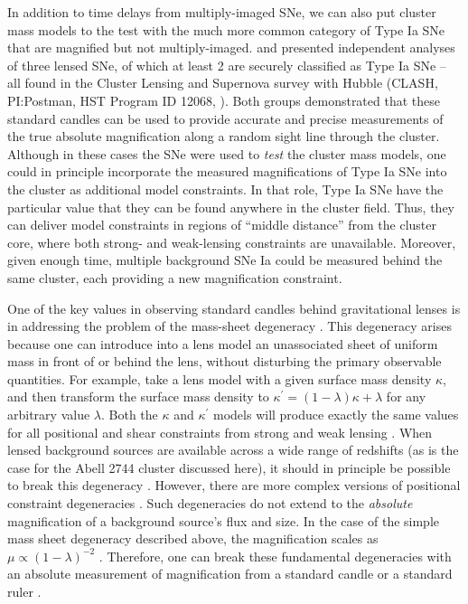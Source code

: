 In addition to time delays from multiply-imaged SNe, we can also
put cluster mass models to the test with the much more common category
of Type Ia SNe that are magnified but not multiply-imaged.  
\citet[][hereafter P14]{Patel:2014} and \citet{Nordin:2014} presented
independent analyses of three lensed SNe, of which at least 2 are
securely classified as Type Ia SNe -- all found in the Cluster Lensing
and Supernova survey with Hubble (CLASH, PI:Postman, HST Program ID
12068, \citealt{Postman:2012}).  Both groups demonstrated that these
standard candles can be used to provide accurate and precise
measurements of the true absolute magnification along a random sight
line through the cluster.  Although in these cases the SNe were used
to {\it test} the cluster mass models, one could in principle
incorporate the measured magnifications of Type Ia SNe into the
cluster as additional model constraints.  In that role, Type Ia SNe
have the particular value that they can be found anywhere in the
cluster field.  Thus, they can deliver model constraints in regions of
``middle distance'' from the cluster core, where both strong- and
weak-lensing constraints are unavailable. Moreover, given
enough time, multiple background SNe Ia could be measured behind the
same cluster, each providing a new magnification constraint.


One of the key values in observing standard candles behind
gravitational lenses is in addressing the problem of the mass-sheet
degeneracy \citep{Falco:1985,Schneider:1995}.  This degeneracy arises
because one can introduce into a lens model an unassociated sheet of
uniform mass in front of or behind the lens, without disturbing the
primary observable quantities.  For example, take a lens model with a
given surface mass density $\kappa$, and then transform the surface
mass density to $\kappa^{\prime}=(1-\lambda)\kappa+\lambda$ for any
arbitrary value $\lambda$.  Both the $\kappa$ and $\kappa^{\prime}$
models will produce exactly the same values for all positional and
shear constraints from strong and weak lensing \citep{Seitz:1997}.
When lensed background sources are available across a wide range of
redshifts (as is the case for the Abell 2744 cluster discussed here),
it should in principle be possible to break this
degeneracy \citep{Seitz:1997,Bradac:2004}.  However, there are more
complex versions of positional constraint
degeneracies \citep{Liesenborgs:2012,Schneider:2014}.  Such
degeneracies do not extend to the {\it absolute} magnification of a
background source's flux and size. In the case of the simple
mass sheet degeneracy described above, the magnification scales as
$\mu\propto(1-\lambda)^{-2}$ \citep[see e.g.][]{Bartelmann:2010}.
Therefore, one can break these fundamental degeneracies with an
absolute measurement of magnification from a standard
candle \citep{Holz:2001} or a standard ruler \citep{Sonnenfeld:2011}.

